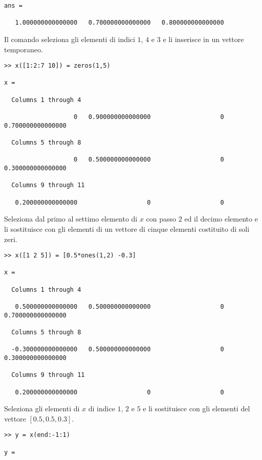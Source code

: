 \begin{enumerate}
\begin{svol}
\begin{codice}
\begin{verbatim}
ans =

   1.000000000000000   0.700000000000000   0.800000000000000

\end{verbatim}
\end{codice}
Il comando seleziona gli elementi di indici $1$, $4$ e $3$ e li inserisce
in un vettore temporaneo.
\begin{codice}
\begin{verbatim}
>> x([1:2:7 10]) = zeros(1,5)

x =

  Columns 1 through 4

                   0   0.900000000000000                   0   0.700000000000000

  Columns 5 through 8

                   0   0.500000000000000                   0   0.300000000000000

  Columns 9 through 11

   0.200000000000000                   0                   0
\end{verbatim}
\end{codice}
Seleziona dal primo al settimo elemento di $x$ con passo $2$ ed il decimo
elemento e li sostituisce con gli elementi di un vettore di cinque elementi
costituito di soli zeri.

\begin{codice}
\begin{verbatim}
>> x([1 2 5]) = [0.5*ones(1,2) -0.3]

x =

  Columns 1 through 4

   0.500000000000000   0.500000000000000                   0   0.700000000000000

  Columns 5 through 8

  -0.300000000000000   0.500000000000000                   0   0.300000000000000

  Columns 9 through 11

   0.200000000000000                   0                   0
\end{verbatim}
\end{codice}
Seleziona gli elementi di $x$ di indice $1$, $2$ e $5$ e li sostituisce con
gli elementi del vettore $[0.5, 0.5, 0.3]$.

\begin{codice}
\begin{verbatim}
>> y = x(end:-1:1)

y =


\end{verbatim}
\end{codice}
\end{svol}
\end{enumerate}
